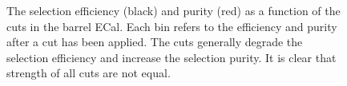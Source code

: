 \begin{figure}
\begin{minipage}{.5\linewidth}
\centering
{}
\end{minipage}\par\medskip
\caption{The selection efficiency (black) and purity (red) as a function of the cuts in the barrel ECal.  Each bin refers to the efficiency and purity after a cut has been applied.  The cuts generally degrade the selection efficiency and increase the selection purity.  It is clear that strength of all cuts are not equal.}
\label{fig:SelEffPurCutLevelBarrel}
\end{figure}
